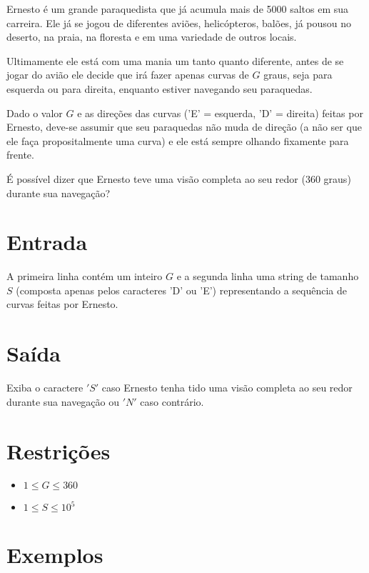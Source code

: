 Ernesto é um grande paraquedista que já acumula mais de 5000 saltos em sua carreira. Ele já se jogou de diferentes aviões, helicópteros, balões, já pousou no deserto, na praia, na floresta e em uma variedade de outros locais.

Ultimamente ele está com uma mania um tanto quanto diferente, antes de se jogar do avião ele decide que irá fazer apenas curvas de $G$ graus, seja para esquerda ou para direita, enquanto estiver navegando seu paraquedas.

Dado o valor $G$ e as direções das curvas ('E' = esquerda, 'D' = direita) feitas por Ernesto, deve-se assumir que seu paraquedas não muda de direção (a não ser que ele faça propositalmente uma curva) e ele está sempre olhando fixamente para frente.

É possível dizer que Ernesto teve uma visão completa ao seu redor (360 graus) durante sua navegação?

\section*{Entrada}

A primeira linha contém um inteiro $G$ e a segunda linha uma string de tamanho $S$ (composta apenas pelos caracteres 'D' ou 'E') representando a sequência de curvas feitas por Ernesto.

\section*{Saída}

Exiba o caractere $'S'$ caso Ernesto tenha tido uma visão completa ao seu redor durante sua navegação ou $'N'$ caso contrário.

\section*{Restrições}

\begin{itemize}
\item $1 \leq G \leq 360$
\item $1 \leq S \leq 10^5$
\end{itemize}

\section*{Exemplos}

\exemplo
